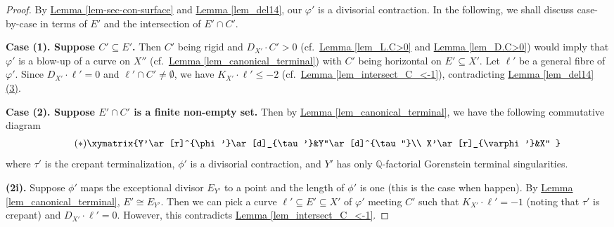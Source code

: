 \begin{proof}
By {\hyperref[lem-sec-con-surface]{Lemma  \ref*{lem-sec-con-surface}}}  and {\hyperref[lem_del14]{Lemma  \ref*{lem_del14}}},  our $\varphi'$ is  a divisorial contraction.
In the following, we shall discuss case-by-case in terms of $E'$ and the intersection of $E'\cap C'$.
\par \vskip 0.4pc \noindent
\textbf{Case (1). Suppose $C'\subseteq E'$.}  
Then $C'$ being rigid and $D_{X'}\cdot C'>0$ (cf.~{\hyperref[lem_L.C>0]{Lemma \ref*{lem_L.C>0}}} and {\hyperref[lem_D.C>0]{Lemma \ref*{lem_D.C>0}}}) would imply that $\varphi'$ is a blow-up of a curve on $X''$ (cf.~{\hyperref[lem_canonical_terminal]{Lemma  \ref*{lem_canonical_terminal}}}) with $C'$ being  horizontal  on $E'\subseteq X'$. 
Let $\ell'$ be a general fibre of $\varphi'$. 
Since $D_{X'}\cdot \ell'=0$ and $\ell' \cap C'\neq\emptyset$, we have $K_{X'}\cdot\ell'\leqslant -2$ (cf.~{\hyperref[lem_intersect_C_<-1]{Lemma \ref*{lem_intersect_C_<-1}}}),  contradicting {\hyperref[lem_del14]{Lemma  \ref*{lem_del14} (3)}}.

\par \vskip 0.4pc \noindent
\textbf{Case (2). Suppose  $E'\cap C'$ is a finite non-empty  set.} 
Then by {\hyperref[lem_canonical_terminal]{Lemma  \ref*{lem_canonical_terminal}}}, we have the following commutative diagram
\begin{align}\label{diagram_4}\tag{$*$}
\xymatrix{Y'\ar[r]^{\phi'}\ar[d]_{\tau'}&Y''\ar[d]^{\tau''}\\
X'\ar[r]_{\varphi'}&X''
}	
\end{align}
where $\tau'$ is the crepant terminalization, $\phi'$ is a divisorial contraction, and $Y'$ has only $\mathbb{Q}$-factorial Gorenstein terminal singularities.

\par \vskip 0.4pc \noindent
\textbf{(2i).} Suppose $\phi'$ maps the exceptional divisor $E_{Y'}$ to a point  and the length of  $\phi'$ is one (this is the case when \cite[Theorem 5 (2), (3) or (4)]{Cut88} happen). 
By {\hyperref[lem_canonical_terminal]{Lemma  \ref*{lem_canonical_terminal}}}, $E'\cong E_{Y'}$.  
Then we can pick a  
curve $\ell'\subseteq E'\subseteq X'$ of $\varphi'$ meeting $C'$ such that $K_{X'}\cdot\ell'=-1$ (noting that $\tau'$ is crepant) and $D_{X'}\cdot \ell'=0$. %
However, this contradicts 
{\hyperref[lem_intersect_C_<-1]{Lemma \ref*{lem_intersect_C_<-1}}}.


\end{proof}

